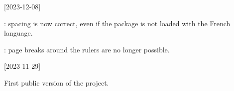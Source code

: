 [2023-12-08]

\begin{tdocfix}
	\item {}: spacing is now correct, even if the  package is not loaded with the French language.

	\item {}: page breaks around the rulers are no longer possible.\end{tdocfix}

\tdocsep

[2023-11-29]

First public version of the project.


